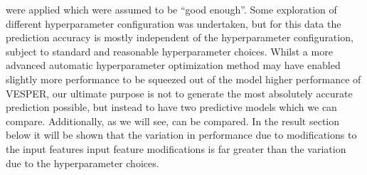 \documentclass[hess, twostagejnl]{copernicus}
\providecommand{\DIFadd}[1]{{\protect\color{blue} \sf #1}} %
\providecommand{\DIFdel}[1]{{\protect\color{red} \scriptsize #1}} %
\providecommand{\DIFaddbegin}{} %
\providecommand{\DIFaddend}{} %
\providecommand{\DIFdelbegin}{} %
\providecommand{\DIFdelend}{} %
\begin{document}
\DIFadd{were applied which were assumed to be “good enough”. Some }\DIFaddend exploration of different hyperparameter configuration was undertaken, but for this data the prediction accuracy is mostly independent of the hyperparameter configuration, subject to standard and reasonable hyperparameter choices. Whilst a more advanced automatic hyperparameter optimization method may have enabled slightly \DIFdelbegin \DIFdel{more performance to be squeezed out of the model}\DIFdelend \DIFaddbegin \DIFadd{higher performance of VESPER}\DIFaddend , our ultimate purpose is not to generate the most absolutely accurate prediction possible, but instead to have two predictive models which \DIFdelbegin \DIFdel{we can compare. Additionally, as we will see, }\DIFdelend \DIFaddbegin \DIFadd{can be compared. In the result section below it will be shown that }\DIFaddend the variation in performance due to \DIFdelbegin \DIFdel{modifications to the input features }\DIFdelend \DIFaddbegin \DIFadd{input feature modifications }\DIFaddend is far greater than the variation due to the hyperparameter choices. \newline 
\end{document}
